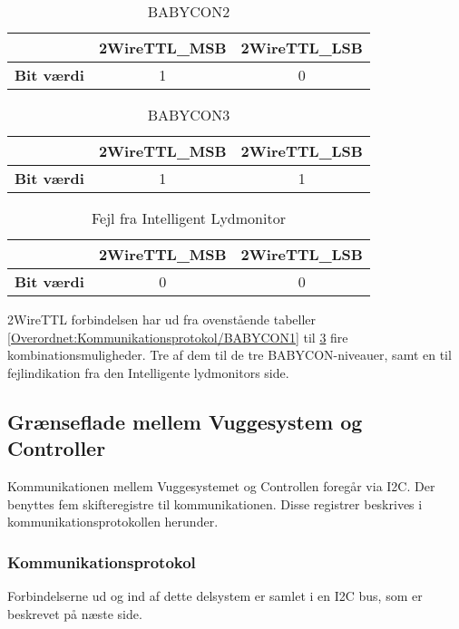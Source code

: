 \begin{table}[H]
	\caption{BABYCON2 }
	\centering
	\begin{tabular}{|l|c|c|}
		\hline 
			&\textbf{2WireTTL\_MSB} & \textbf{2WireTTL\_LSB}     \\ 
		\hline 
		\textbf{Bit værdi} &1 & 0     \\ 
		\hline
	\end{tabular} 
	\label{Overordnet:Kommunikationsprotokol/BABYCON2}
\end{table}


\begin{table}[H]
	\caption{BABYCON3 }
	\centering
	\begin{tabular}{|l|c|c|}
		\hline 
			&\textbf{2WireTTL\_MSB} & \textbf{2WireTTL\_LSB}     \\ 
		\hline 
		\textbf{Bit værdi} &1 & 1     \\ 
		\hline
	\end{tabular} 
	\label{Overordnet:Kommunikationsprotokol/BABYCON3}
\end{table}


\begin{table}[H]
	\caption{Fejl fra Intelligent Lydmonitor }
	\centering
	\begin{tabular}{|l|c|c|}
		\hline 
			&\textbf{2WireTTL\_MSB} & \textbf{2WireTTL\_LSB}     \\ 
		\hline 
		\textbf{Bit værdi} &0 & 0     \\ 
		\hline
	\end{tabular} 
	\label{Overordnet:Kommunikationsprotokol/IL_fejl}
\end{table}

2WireTTL forbindelsen har ud fra ovenstående tabeller \ref{Overordnet:Kommunikationsprotokol/BABYCON1} til \ref{Overordnet:Kommunikationsprotokol/IL_fejl} fire kombinationsmuligheder. Tre af dem til de tre BABYCON-niveauer, samt en til fejlindikation fra den Intelligente lydmonitors side. 

\subsection{Grænseflade mellem Vuggesystem og Controller}
Kommunikationen mellem Vuggesystemet og Controllen foregår via I2C. Der benyttes fem skifteregistre til kommunikationen. Disse registrer beskrives i kommunikationsprotokollen herunder.

\subsubsection{Kommunikationsprotokol}
Forbindelserne ud og ind af dette delsystem er samlet i en I2C bus, som er beskrevet på næste side.


